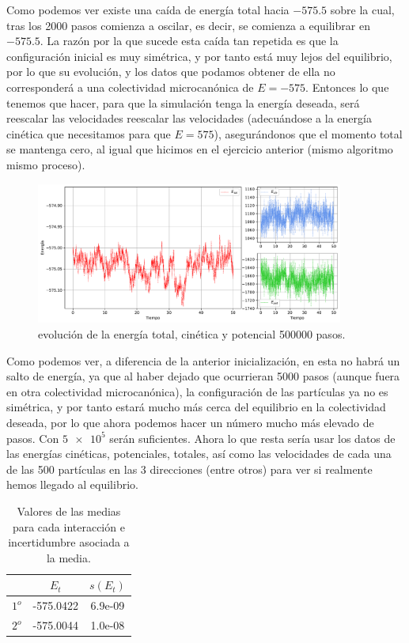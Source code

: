\documentclass[11pt]{article} %
\begin{document}
Como podemos ver existe una caída de energía total hacia $-575.5$ sobre la cual, tras los 2000 pasos comienza a oscilar, es decir, se comienza a equilibrar en $-575.5$. La razón por la que sucede esta caída tan repetida es que la configuración inicial es muy simétrica, y por tanto está muy lejos del equilibrio, por lo que su evolución, y los datos que podamos obtener de ella no corresponderá a una colectividad microcanónica de $E=-575$. Entonces lo que tenemos que hacer, para que la simulación tenga la energía deseada, será reescalar las velocidades reescalar las velocidades (adecuándose a la energía cinética que necesitamos para que $E=575$), asegurándonos que el momento total se mantenga cero, al igual que hicimos en el ejercicio anterior (mismo algoritmo mismo proceso).


\begin{figure}[h!] \centering
	\includegraphics[width=0.9\textwidth]{../../Graficas/Et-equilibra-500K-1.pdf}
	\caption{evolución de la energía total, cinética y potencial 500000 pasos.}
	\label{Fig:02}
\end{figure}	

Como podemos ver, a diferencia de la anterior inicialización, en esta no habrá un salto de energía, ya que al haber dejado que ocurrieran 5000 pasos (aunque fuera en otra colectividad microcanónica), la configuración de las partículas ya no es simétrica, y por tanto estará mucho más cerca del equilibrio en la colectividad deseada, por lo que ahora podemos hacer un número mucho más elevado de pasos. Con $\num{5e5}$ serán suficientes. Ahora lo que resta sería usar los datos de las energías cinéticas, potenciales, totales, así como las velocidades de cada una de las 500 partículas en las 3 direcciones (entre otros) para ver si realmente hemos llegado al equilibrio.  

\begin{table}[h!] \centering
	\begin{tabular}{c|c|c}
		& $E_t$ & $s(E_t)$ \\ \hline
		$1^o$ &-575.0422 & 6.9e-09  \\ \hline
		$2^o$ & -575.0044 & 1.0e-08 
	\end{tabular}
	\caption{Valores de las medias para cada interacción e incertidumbre asociada a la media.}
	\label{Tab:01}
\end{table}
\end{document}
